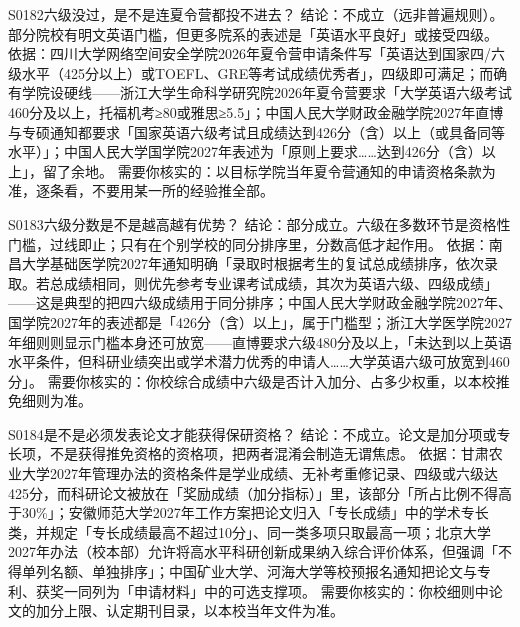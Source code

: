\begin{qa}{S0182}{六级没过，是不是连夏令营都投不进去？}
结论：不成立（远非普遍规则）。部分院校有明文英语门槛，但更多院系的表述是「英语水平良好」或接受四级。
依据：四川大学网络空间安全学院2026年夏令营申请条件写「英语达到国家四/六级水平（425分以上）或TOEFL、GRE等考试成绩优秀者」，四级即可满足；而确有学院设硬线——浙江大学生命科学研究院2026年夏令营要求「大学英语六级考试460分及以上，托福机考≥80或雅思≥5.5」；中国人民大学财政金融学院2027年直博与专硕通知都要求「国家英语六级考试且成绩达到426分（含）以上（或具备同等水平）」；中国人民大学国学院2027年表述为「原则上要求……达到426分（含）以上」，留了余地。
需要你核实的：以目标学院当年夏令营通知的申请资格条款为准，逐条看，不要用某一所的经验推全部。
\end{qa}

\begin{qa}{S0183}{六级分数是不是越高越有优势？}
结论：部分成立。六级在多数环节是资格性门槛，过线即止；只有在个别学校的同分排序里，分数高低才起作用。
依据：南昌大学基础医学院2027年通知明确「录取时根据考生的复试总成绩排序，依次录取。若总成绩相同，则优先参考专业课考试成绩，其次为英语六级、四级成绩」——这是典型的把四六级成绩用于同分排序；中国人民大学财政金融学院2027年、国学院2027年的表述都是「426分（含）以上」，属于门槛型；浙江大学医学院2027年细则则显示门槛本身还可放宽——直博要求六级480分及以上，「未达到以上英语水平条件，但科研业绩突出或学术潜力优秀的申请人……大学英语六级可放宽到460分」。
需要你核实的：你校综合成绩中六级是否计入加分、占多少权重，以本校推免细则为准。
\end{qa}

\begin{qa}{S0184}{是不是必须发表论文才能获得保研资格？}
结论：不成立。论文是加分项或专长项，不是获得推免资格的资格项，把两者混淆会制造无谓焦虑。
依据：甘肃农业大学2027年管理办法的资格条件是学业成绩、无补考重修记录、四级或六级达425分，而科研论文被放在「奖励成绩（加分指标）」里，该部分「所占比例不得高于30\%」；安徽师范大学2027年工作方案把论文归入「专长成绩」中的学术专长类，并规定「专长成绩最高不超过10分」、同一类多项只取最高一项；北京大学2027年办法（校本部）允许将高水平科研创新成果纳入综合评价体系，但强调「不得单列名额、单独排序」；中国矿业大学、河海大学等校预报名通知把论文与专利、获奖一同列为「申请材料」中的可选支撑项。
需要你核实的：你校细则中论文的加分上限、认定期刊目录，以本校当年文件为准。
\end{qa}

